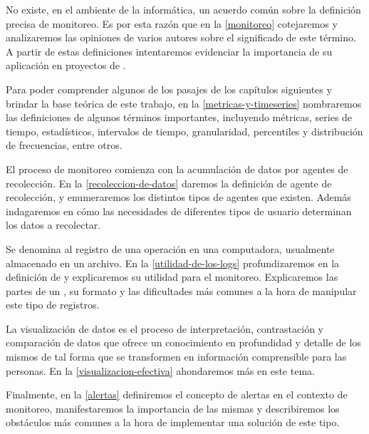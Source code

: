 No existe, en el ambiente de la informática, un acuerdo común sobre la
definición precisa de monitoreo. Es por esta razón que en la \autoref{monitoreo}
cotejaremos y analizaremos las opiniones de varios autores sobre el significado
de este término. A partir de estas definiciones intentaremos evidenciar la
importancia de su aplicación en proyectos de .

Para poder comprender algunos de los pasajes de los capítulos siguientes y
brindar la base teórica de este trabajo, en la \autoref{metricas-y-timeseries}
nombraremos las definiciones de algunos términos importantes, incluyendo
métricas, series de tiempo, estadísticos, intervalos de tiempo, granularidad,
percentiles y distribución de frecuencias, entre otros.

El proceso de monitoreo comienza con la acumulación de datos por agentes de
recolección. En la \autoref{recoleccion-de-datos} daremos la definición
de agente de recolección, y enumeraremos los distintos tipos de agentes que
existen. Además indagaremos en cómo las necesidades de diferentes tipos de
usuario determinan los datos a recolectar.

Se denomina  al registro de una operación en una computadora,
usualmente almacenado en un archivo. En la \autoref{utilidad-de-los-logs}
profundizaremos en la definición de  y explicaremos su utilidad para
el monitoreo.  Explicaremos las partes de un , su formato y las
dificultades más comunes a la hora de manipular este tipo de registros.

La visualización de datos es el proceso de interpretación, contrastación y
comparación de datos que ofrece un conocimiento en profundidad y detalle de
los mismos de tal forma que se transformen en información comprensible para las
personas. En la \autoref{visualizacion-efectiva} ahondaremos más en este tema.

Finalmente, en la \autoref{alertas} definiremos el concepto de alertas en el
contexto de monitoreo, manifestaremos la importancia de las mismas y
describiremos los obstáculos más comunes a la hora de implementar una solución
de este tipo.
